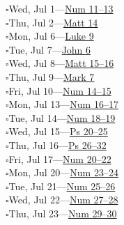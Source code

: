 \hypertarget{rp-2026-07-01}{}\noindent$\square$\enspace Wed, Jul 1\enspace---\enspace \hyperlink{ch-numbers-11}{Num 11--13}\\
\hypertarget{rp-2026-07-02}{}\noindent$\square$\enspace Thu, Jul 2\enspace---\enspace \hyperlink{ch-matthew-14}{Matt 14}\\
\hypertarget{rp-2026-07-06}{}\noindent$\square$\enspace Mon, Jul 6\enspace---\enspace \hyperlink{ch-luke-9}{Luke 9}\\
\hypertarget{rp-2026-07-07}{}\noindent$\square$\enspace Tue, Jul 7\enspace---\enspace \hyperlink{ch-john-6}{John 6}\\
\hypertarget{rp-2026-07-08}{}\noindent$\square$\enspace Wed, Jul 8\enspace---\enspace \hyperlink{ch-matthew-15}{Matt 15--16}\\
\hypertarget{rp-2026-07-09}{}\noindent$\square$\enspace Thu, Jul 9\enspace---\enspace \hyperlink{ch-mark-7}{Mark 7}\\
\hypertarget{rp-2026-07-10}{}\noindent$\square$\enspace Fri, Jul 10\enspace---\enspace \hyperlink{ch-numbers-14}{Num 14--15}\\
\hypertarget{rp-2026-07-13}{}\noindent$\square$\enspace Mon, Jul 13\enspace---\enspace \hyperlink{ch-numbers-16}{Num 16--17}\\
\hypertarget{rp-2026-07-14}{}\noindent$\square$\enspace Tue, Jul 14\enspace---\enspace \hyperlink{ch-numbers-18}{Num 18--19}\\
\hypertarget{rp-2026-07-15}{}\noindent$\square$\enspace Wed, Jul 15\enspace---\enspace \hyperlink{ch-psalms-20}{Ps 20--25}\\
\hypertarget{rp-2026-07-16}{}\noindent$\square$\enspace Thu, Jul 16\enspace---\enspace \hyperlink{ch-psalms-26}{Ps 26--32}\\
\hypertarget{rp-2026-07-17}{}\noindent$\square$\enspace Fri, Jul 17\enspace---\enspace \hyperlink{ch-numbers-20}{Num 20--22}\\
\hypertarget{rp-2026-07-20}{}\noindent$\square$\enspace Mon, Jul 20\enspace---\enspace \hyperlink{ch-numbers-23}{Num 23--24}\\
\hypertarget{rp-2026-07-21}{}\noindent$\square$\enspace Tue, Jul 21\enspace---\enspace \hyperlink{ch-numbers-25}{Num 25--26}\\
\hypertarget{rp-2026-07-22}{}\noindent$\square$\enspace Wed, Jul 22\enspace---\enspace \hyperlink{ch-numbers-27}{Num 27--28}\\
\hypertarget{rp-2026-07-23}{}\noindent$\square$\enspace Thu, Jul 23\enspace---\enspace \hyperlink{ch-numbers-29}{Num 29--30}\\
